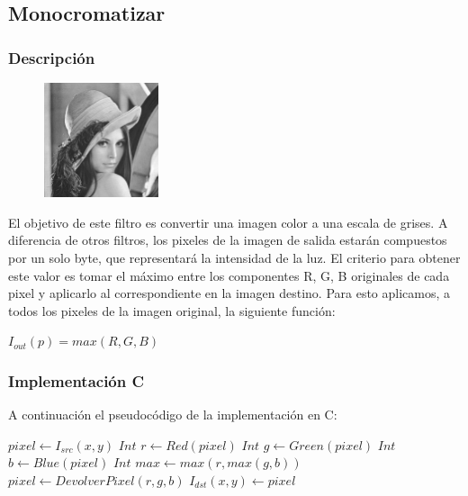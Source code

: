 \subsection{Monocromatizar}

\subsubsection{Descripción}

\begin{figure}
	\centering
	\includegraphics[width=0.3\textwidth]{imagenes/lenaMONO.jpg}
\end{figure}

El objetivo de este filtro es convertir una imagen color a una escala de grises. A diferencia de otros filtros, los pixeles de la imagen de salida estarán compuestos por un solo byte, que representará la intensidad de la luz. El criterio para obtener este valor es tomar el máximo entre los componentes R, G, B originales de cada pixel y aplicarlo al correspondiente en la imagen destino. Para esto aplicamos, a todos los pixeles de la imagen original, la siguiente función:

\begin{center}
	$I_{out}(p) = max(R, G, B)$
\end{center}

\hfill

\subsubsection{Implementación C}

A continuación el pseudocódigo de la implementación en C:

\begin{algorithm}[H]
  \begin{algorithmic}[1]
			  \STATE $pixel \gets I_{src}(x,y)$
			  \STATE $Int$ $ r \gets Red(pixel) $
			  \STATE $Int$ $g \gets Green(pixel)$
			  \STATE $Int$ $ b \gets Blue(pixel)$
			  \STATE $Int$ $max \gets max(r, max(g, b))$
			  \STATE $pixel \gets DevolverPixel(r,g,b)$
			  \STATE $I_{dst}(x,y) \gets pixel$
			\ENDFOR
		 \ENDFOR
  \end{algorithmic}
  \caption{$monocromatizar (I_{src}, I_{dst})$}
  \label{alg:monocromatizar}
\end{algorithm}

